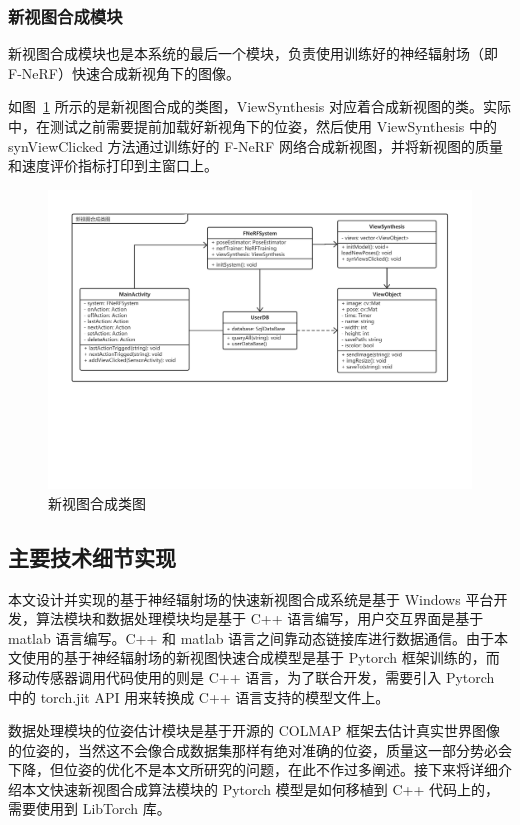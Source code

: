 \subsubsection{新视图合成模块}
新视图合成模块也是本系统的最后一个模块，负责使用训练好的神经辐射场（即 F-NeRF）快速合成新视角下的图像。

如图~\ref{fig:viewSynthesisCD} 所示的是新视图合成的类图，ViewSynthesis 对应着合成新视图的类。实际中，在测试之前需要提前加载好新视角下的位姿，然后使用 ViewSynthesis 中的 synViewClicked 方法通过训练好的 F-NeRF 网络合成新视图，并将新视图的质量和速度评价指标打印到主窗口上。
\begin{figure}[htbp]
	\centering
	\includegraphics[width=0.95\linewidth]{figures/viewSynthesisCD.pdf}
	\caption{新视图合成类图}
	\label{fig:viewSynthesisCD}
\end{figure}

\subsection{主要技术细节实现}
本文设计并实现的基于神经辐射场的快速新视图合成系统是基于 Windows 平台开发，算法模块和数据处理模块均是基于 C++ 语言编写，用户交互界面是基于 matlab 语言编写。C++ 和 matlab 语言之间靠动态链接库进行数据通信。由于本文使用的基于神经辐射场的新视图快速合成模型是基于 Pytorch 框架训练的，而移动传感器调用代码使用的则是 C++ 语言，为了联合开发，需要引入 Pytorch 中的 torch.jit API 用来转换成 C++ 语言支持的模型文件上。

数据处理模块的位姿估计模块是基于开源的 COLMAP 框架去估计真实世界图像的位姿的，当然这不会像合成数据集那样有绝对准确的位姿，质量这一部分势必会下降，但位姿的优化不是本文所研究的问题，在此不作过多阐述。接下来将详细介绍本文快速新视图合成算法模块的 Pytorch 模型是如何移植到 C++ 代码上的，需要使用到 LibTorch 库。

